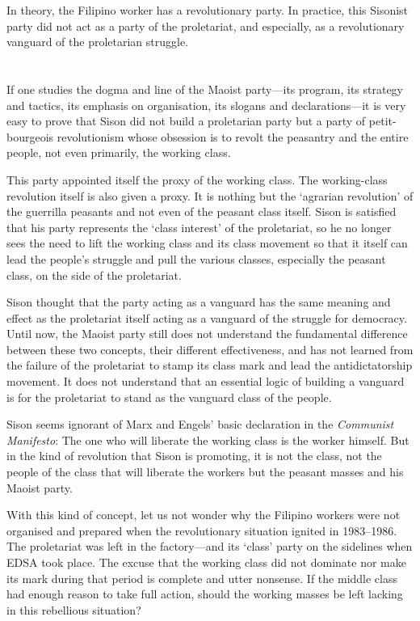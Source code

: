 In theory,
the Filipino worker has a revolutionary party.
In practice,
this Sisonist party 
did not act as a party of the proletariat,
and especially,
as a revolutionary vanguard of the proletarian struggle.


\section{}
If one studies the dogma and line of the Maoist party---its program, 
its strategy and tactics, 
its emphasis on organisation, 
its slogans and declarations---it 
is very easy to prove that Sison 
did not build a proletarian party 
but a party of petit-bourgeois revolutionism 
whose obsession is to revolt the peasantry and the entire people, 
not even primarily, the working class.

This party appointed itself the proxy of the working class. 
The working-class revolution itself is also given a proxy. 
It is nothing but the `agrarian revolution' 
of the guerrilla peasants 
and not even of the peasant class itself. 
Sison is satisfied that his party represents 
the `class interest' of the proletariat, 
so he no longer sees the need to lift 
the working class and its class movement 
so that it itself can lead the people's struggle 
and pull the various classes, 
especially the peasant class, 
on the side of the proletariat.

Sison thought that the party acting as a vanguard
has the same meaning and effect 
as the proletariat itself acting as 
a vanguard of the struggle for democracy. 
Until now, 
the Maoist party still does not understand 
the fundamental difference between these two concepts, 
their different effectiveness, 
and has not learned from the failure of the proletariat 
to stamp its class mark 
and lead the antidictatorship movement. 
It does not understand that 
an essential logic of building a vanguard 
is for the proletariat 
to stand as the vanguard class of the people.

Sison seems ignorant of Marx and Engels' basic declaration 
in the \textit{Communist Manifesto}:
The one who will liberate the working class is the worker himself.
But in the kind of revolution that Sison is promoting, 
it is not the class, 
not the people of the class 
that will liberate the workers 
but the peasant masses and his Maoist party.

With this kind of concept, 
let us not wonder why the Filipino workers 
were not organised and prepared 
when the revolutionary situation ignited in 1983--1986. 
The proletariat was left in the factory---and 
its `class' party on the sidelines when EDSA took place. 
The excuse that the working class did not dominate nor make its mark 
during that period 
is complete and utter nonsense.
If the middle class had enough reason to take full action, 
should the working masses be left lacking in this rebellious situation?


